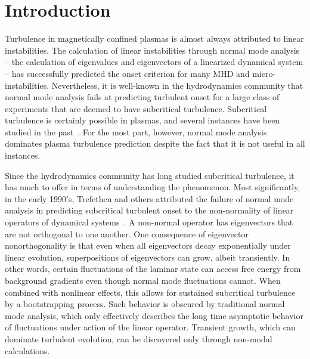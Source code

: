 \documentclass[letter,scriptaddress,twocolumn, prl,showkeys]{revtex4}
\begin{document}
\title{}

\author{B. Friedman}

\author{T.A. Carter}




\begin{abstract}

\end{abstract}

\maketitle

\section{Introduction}

Turbulence in magnetically confined plasmas is almost always attributed to linear instabilities. The calculation of linear instabilities through normal mode analysis
-- the calculation of eigenvalues and eigenvectors of a linearized dynamical system -- has successfully predicted the onset criterion for many MHD and micro-instabilities.
Nevertheless, it is well-known in the hydrodynamics community that normal mode analysis fails at predicting turbulent onset for a large class of experiments that are deemed to have
subcritical turbulence. Subcritical turbulence is certainly possible in plasmas, and several instances have been studied in the 
past~\cite{waltz1985,scott1990,scott1992,nordman1993,biskamp1995,drake1995,camargo1998,krommes1999,scott2002,camporeale2009,camporeale2010,schekochihin2012,highcock2012}. 
For the most part, however, normal mode analysis dominates plasma turbulence prediction despite the fact that it is not useful in all instances.

Since the hydrodynamics community has long studied subcritical turbulence, it has much to offer in terms of understanding the phenomenon. Most significantly,
in the early 1990's, Trefethen and others attributed the failure of normal mode analysis in predicting subcritical turbulent onset to the non-normality of linear operators of
dynamical systems~\cite{trefethen1993,schmid2007}. A non-normal operator has 
eigenvectors that are not orthogonal to one another. One consequence of eigenvector nonorthogonality is that even when all eigenvectors decay exponentially under linear evolution, 
superpositions of eigenvectors can grow, albeit transiently.
In other words, certain fluctuations of the laminar state can access free energy from background gradients even though normal mode fluctuations cannot.
When combined with nonlinear effects, this allows for sustained subcritical turbulence by a bootstrapping process.
Such behavior is obscured by traditional normal mode analysis, which only effectively describes the long time asymptotic behavior of fluctuations under  
action of the linear operator. Transient growth, which can dominate turbulent evolution, can be discovered only through non-modal calculations.
\end{document}
